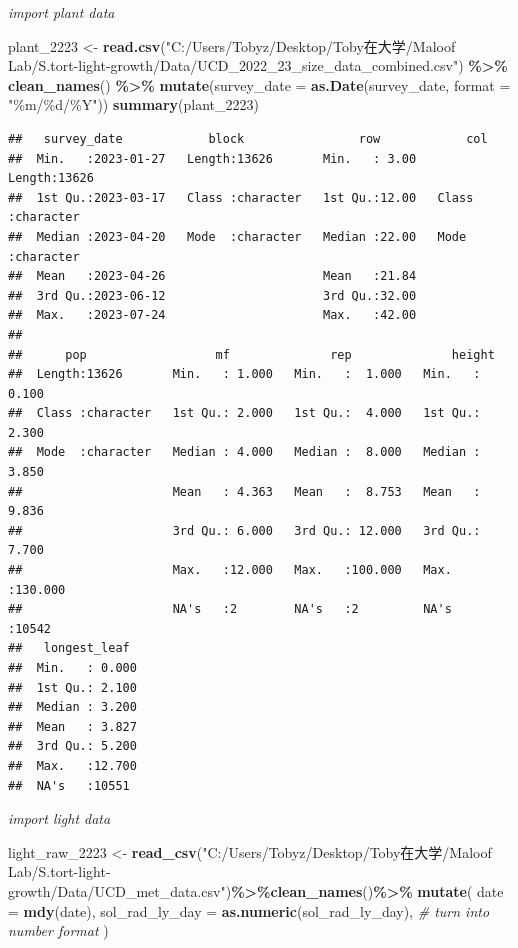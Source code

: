 \documentclass[
]{article}
\newenvironment{Shaded}{\begin{snugshade}}{\end{snugshade}}
\newcommand{\AttributeTok}[1]{\textcolor[rgb]{0.13,0.29,0.53}{#1}}
\newcommand{\CommentTok}[1]{\textcolor[rgb]{0.56,0.35,0.01}{\textit{#1}}}
\newcommand{\FunctionTok}[1]{\textcolor[rgb]{0.13,0.29,0.53}{\textbf{#1}}}
\newcommand{\NormalTok}[1]{#1}
\newcommand{\OtherTok}[1]{\textcolor[rgb]{0.56,0.35,0.01}{#1}}
\newcommand{\SpecialCharTok}[1]{\textcolor[rgb]{0.81,0.36,0.00}{\textbf{#1}}}
\newcommand{\StringTok}[1]{\textcolor[rgb]{0.31,0.60,0.02}{#1}}
\begin{document}
\emph{import plant data}

\begin{Shaded}
\begin{Highlighting}[]
\NormalTok{plant\_2223 }\OtherTok{\textless{}{-}} \FunctionTok{read.csv}\NormalTok{(}\StringTok{"C:/Users/Tobyz/Desktop/Toby在大学/Maloof Lab/S.tort{-}light{-}growth/Data/UCD\_2022\_23\_size\_data\_combined.csv"}\NormalTok{) }\SpecialCharTok{\%\textgreater{}\%}
  \FunctionTok{clean\_names}\NormalTok{() }\SpecialCharTok{\%\textgreater{}\%}
  \FunctionTok{mutate}\NormalTok{(}\AttributeTok{survey\_date =} \FunctionTok{as.Date}\NormalTok{(survey\_date, }\AttributeTok{format =} \StringTok{"\%m/\%d/\%Y"}\NormalTok{))}
\FunctionTok{summary}\NormalTok{(plant\_2223)}
\end{Highlighting}
\end{Shaded}

\begin{verbatim}
##   survey_date            block                row            col           
##  Min.   :2023-01-27   Length:13626       Min.   : 3.00   Length:13626      
##  1st Qu.:2023-03-17   Class :character   1st Qu.:12.00   Class :character  
##  Median :2023-04-20   Mode  :character   Median :22.00   Mode  :character  
##  Mean   :2023-04-26                      Mean   :21.84                     
##  3rd Qu.:2023-06-12                      3rd Qu.:32.00                     
##  Max.   :2023-07-24                      Max.   :42.00                     
##                                                                            
##      pop                  mf              rep              height       
##  Length:13626       Min.   : 1.000   Min.   :  1.000   Min.   :  0.100  
##  Class :character   1st Qu.: 2.000   1st Qu.:  4.000   1st Qu.:  2.300  
##  Mode  :character   Median : 4.000   Median :  8.000   Median :  3.850  
##                     Mean   : 4.363   Mean   :  8.753   Mean   :  9.836  
##                     3rd Qu.: 6.000   3rd Qu.: 12.000   3rd Qu.:  7.700  
##                     Max.   :12.000   Max.   :100.000   Max.   :130.000  
##                     NA's   :2        NA's   :2         NA's   :10542    
##   longest_leaf   
##  Min.   : 0.000  
##  1st Qu.: 2.100  
##  Median : 3.200  
##  Mean   : 3.827  
##  3rd Qu.: 5.200  
##  Max.   :12.700  
##  NA's   :10551
\end{verbatim}

\emph{import light data}

\begin{Shaded}
\begin{Highlighting}[]
\NormalTok{light\_raw\_2223 }\OtherTok{\textless{}{-}} \FunctionTok{read\_csv}\NormalTok{(}\StringTok{"C:/Users/Tobyz/Desktop/Toby在大学/Maloof Lab/S.tort{-}light{-}growth/Data/UCD\_met\_data.csv"}\NormalTok{)}\SpecialCharTok{\%\textgreater{}\%}\FunctionTok{clean\_names}\NormalTok{()}\SpecialCharTok{\%\textgreater{}\%}
 \FunctionTok{mutate}\NormalTok{(}
    \AttributeTok{date =} \FunctionTok{mdy}\NormalTok{(date),}
    \AttributeTok{sol\_rad\_ly\_day =} \FunctionTok{as.numeric}\NormalTok{(sol\_rad\_ly\_day),  }\CommentTok{\# turn into number format}
\NormalTok{  )}
\end{Highlighting}
\end{Shaded}
\end{document}
